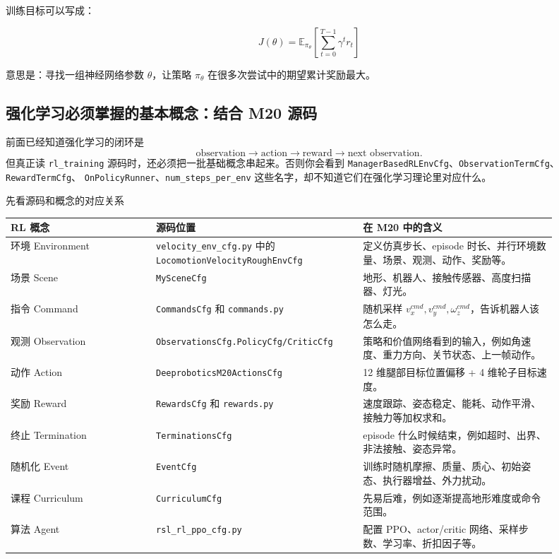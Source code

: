 \documentclass[UTF8,11pt,a4paper]{ctexart}
\begin{document}
训练目标可以写成：

\[
\boxed{
J(\theta)
=
\mathbb E_{\pi_\theta}
\left[
\sum_{t=0}^{T-1}\gamma^t r_t
\right]
}
\]

意思是：寻找一组神经网络参数 \(\theta\)，让策略 \(\pi_\theta\) 在很多次尝试中的期望累计奖励最大。

\subsection{强化学习必须掌握的基本概念：结合 M20 源码}

前面已经知道强化学习的闭环是
\[
\text{observation}\rightarrow \text{action}\rightarrow \text{reward}\rightarrow \text{next observation}.
\]
但真正读 \texttt{rl\_training} 源码时，还必须把一批基础概念串起来。否则你会看到
\texttt{ManagerBasedRLEnvCfg}、\texttt{ObservationTermCfg}、\texttt{RewardTermCfg}、
\texttt{OnPolicyRunner}、\texttt{num\_steps\_per\_env} 这些名字，却不知道它们在强化学习理论里对应什么。

\begin{greenbox}{先看源码和概念的对应关系}
\begin{center}
\renewcommand{\arraystretch}{1.25}
\begin{tabular}{p{0.24\linewidth}p{0.34\linewidth}p{0.32\linewidth}}
\toprule
\textbf{RL 概念} & \textbf{源码位置} & \textbf{在 M20 中的含义}\\
\midrule
环境 Environment &
\texttt{velocity\_env\_cfg.py} 中的 \texttt{LocomotionVelocityRoughEnvCfg} &
定义仿真步长、episode 时长、并行环境数量、场景、观测、动作、奖励等。\\
场景 Scene &
\texttt{MySceneCfg} &
地形、机器人、接触传感器、高度扫描器、灯光。\\
指令 Command &
\texttt{CommandsCfg} 和 \texttt{commands.py} &
随机采样 \(v_x^{cmd},v_y^{cmd},\omega_z^{cmd}\)，告诉机器人该怎么走。\\
观测 Observation &
\texttt{ObservationsCfg.PolicyCfg/CriticCfg} &
策略和价值网络看到的输入，例如角速度、重力方向、关节状态、上一帧动作。\\
动作 Action &
\texttt{DeeproboticsM20ActionsCfg} &
12 维腿部目标位置偏移 + 4 维轮子目标速度。\\
奖励 Reward &
\texttt{RewardsCfg} 和 \texttt{rewards.py} &
速度跟踪、姿态稳定、能耗、动作平滑、接触力等加权求和。\\
终止 Termination &
\texttt{TerminationsCfg} &
episode 什么时候结束，例如超时、出界、非法接触、姿态异常。\\
随机化 Event &
\texttt{EventCfg} &
训练时随机摩擦、质量、质心、初始姿态、执行器增益、外力扰动。\\
课程 Curriculum &
\texttt{CurriculumCfg} &
先易后难，例如逐渐提高地形难度或命令范围。\\
算法 Agent &
\texttt{rsl\_rl\_ppo\_cfg.py} &
配置 PPO、actor/critic 网络、采样步数、学习率、折扣因子等。\\
\bottomrule
\end{tabular}
\end{center}
\end{greenbox}
\end{document}
